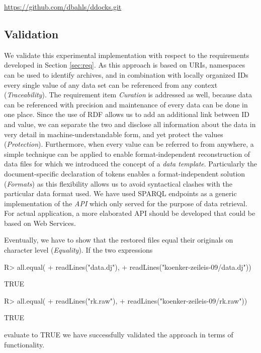 \documentclass{acm_proc_article-sp}
\begin{document}
%
%
\url{https://github.com/dbahls/ddocks.git}




\subsection{Validation}


We validate this experimental implementation with respect to the requirements developed in Section \ref{sec:req}.
As this approach is based on URIs, namespaces can be used to identify archives, and in combination with locally organized IDs every single value of any data set can be referenced from any context (\textit{Traceability}).
The requirement item \textit{Curation} is addressed as well, because data can be referenced with precision and maintenance of every data can be done in one place. 
Since the use of RDF allows us to add an additional link between ID and value, we can separate the two and disclose all information about the data in very detail in machine-understandable form, and yet protect the values (\textit{Protection}).
Furthermore, when every value can be referred to from anywhere, a simple technique can be applied to enable format-independent reconstruction of data files for which we introduced the concept of a \textit{data template}.
Particularly the document-specific declaration of tokens enables a format-independent solution (\textit{Formats}) as this flexibility allows us to avoid syntactical clashes with the particular data format used.
We have used SPARQL endpoints as a generic implementation of the \textit{API} which only served for the purpose of data retrieval.
For actual application, a more elaborated API should be developed that could be based on Web Services.



Eventually, we have to show that the restored files equal their originals on character level (\textit{Equality}).
If the two expressions
\begin{Schunk}
\begin{Sinput}
R> all.equal(
+    readLines("data.dj"), 
+    readLines("koenker-zeileis-09/data.dj")) 
\end{Sinput}
\begin{Soutput}
[1] TRUE
\end{Soutput}
\begin{Sinput}
R> all.equal(
+    readLines("rk.raw"), 
+    readLines("koenker-zeileis-09/rk.raw")) 
\end{Sinput}
\begin{Soutput}
[1] TRUE
\end{Soutput}
\end{Schunk}
evaluate to TRUE we have successfully validated the approach in terms of functionality.
\end{document}
